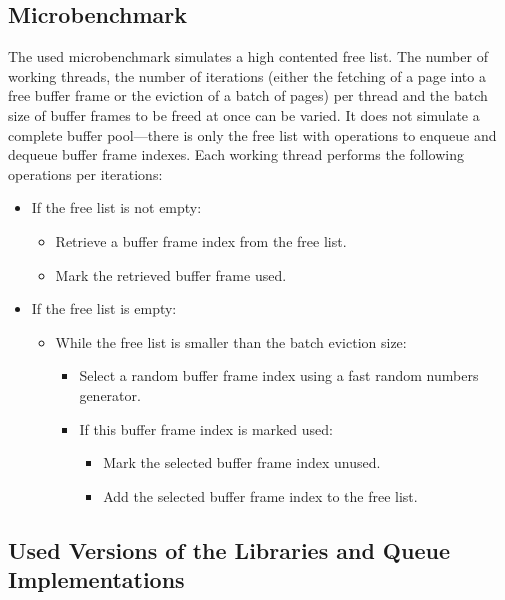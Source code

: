 \subsection[Microbenchmark]{Microbenchmark} \label{subsec:free-list-microbenchmark}

	The used microbenchmark simulates a high contented free list. The number of working threads, the number of iterations (either the fetching of a page into a free buffer frame or the eviction of a batch of pages) per thread and the batch size of buffer frames to be freed at once can be varied. It does not simulate a complete buffer pool---there is only the free list with operations to enqueue and dequeue buffer frame indexes. Each working thread performs the following operations per iterations:
	
\begin{@empty}
	\begin{itemize}
		\itemsep0em
		\item If the free list is not empty:
			\begin{itemize}
				\item Retrieve a buffer frame index from the free list.
				\item Mark the retrieved buffer frame used.
			\end{itemize}
		\item If the free list is empty:
			\begin{itemize}
				\item While the free list is smaller than the batch eviction size:
					\begin{itemize}
						\item Select a random buffer frame index using a fast random numbers generator.
						\item If this buffer frame index is marked used:
							\begin{itemize}
								\item Mark the selected buffer frame index unused.
								\item Add the selected buffer frame index to the free list.
							\end{itemize}
					\end{itemize}
			\end{itemize}
	\end{itemize}
\end{@empty}

\subsection[Queue Versions]{Used Versions of the Libraries and Queue Implementations} \label{subsec:free-list-versions}


